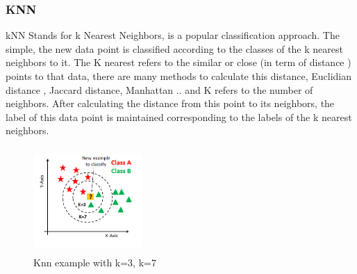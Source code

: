 \subsubsection{KNN}
kNN Stands for k Nearest Neighbors, is a popular classification approach. The simple, the new data point is classified according to the classes of the k nearest neighbors to it. The K nearest refers to the similar or close (in term of distance ) points to that data, there are many methods to calculate this distance, Euclidian distance , Jaccard distance, Manhattan .. and K refers to the number of neighbors. After calculating the distance from this point to its neighbors, the label of this data point is maintained corresponding to the labels of the k nearest neighbors.\cite{book5}
\begin{figure}[!h]
    \centering
    \includegraphics[height=4cm,width=0.37\textwidth]{chapters/chapter02/fig02/knn.png}
    \caption{Knn example with k=3, k=7}
    \label{fig:my_label}
\end{figure}
